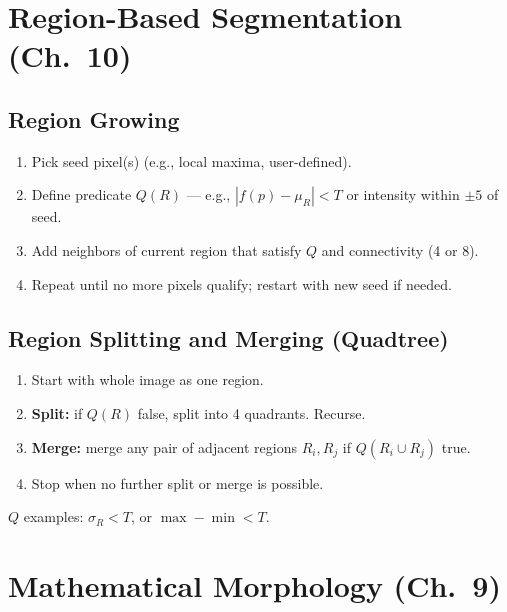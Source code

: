 \documentclass[10pt]{article}
\begin{document}
\section{Region-Based Segmentation (Ch.~10)}

\subsection{Region Growing}
\begin{tcolorbox}[procbox]
\begin{enumerate}
  \item Pick seed pixel(s) (e.g., local maxima, user-defined).
  \item Define predicate $Q(R)$ — e.g., $|f(p)-\mu_R|<T$ or intensity within $\pm5$ of seed.
  \item Add neighbors of current region that satisfy $Q$ and connectivity (4 or 8).
  \item Repeat until no more pixels qualify; restart with new seed if needed.
\end{enumerate}
\end{tcolorbox}

\subsection{Region Splitting and Merging (Quadtree)}
\begin{tcolorbox}[procbox]
\begin{enumerate}
  \item Start with whole image as one region.
  \item \textbf{Split:} if $Q(R)$ false, split into 4 quadrants. Recurse.
  \item \textbf{Merge:} merge any pair of adjacent regions $R_i, R_j$ if $Q(R_i \cup R_j)$ true.
  \item Stop when no further split or merge is possible.
\end{enumerate}
$Q$ examples: $\sigma_R < T$, or $\max-\min < T$.
\end{tcolorbox}

\section{Mathematical Morphology (Ch.~9)}
\end{document}
